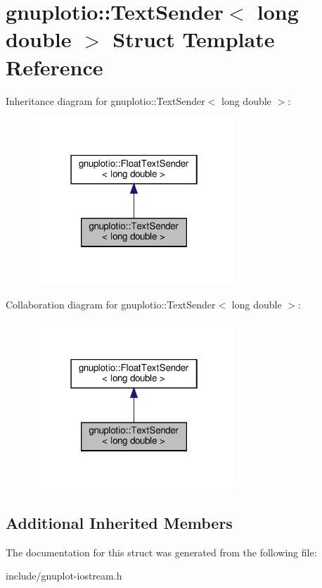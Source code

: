 \hypertarget{structgnuplotio_1_1TextSender_3_01long_01double_01_4}{}\section{gnuplotio\+:\+:Text\+Sender$<$ long double $>$ Struct Template Reference}
\label{structgnuplotio_1_1TextSender_3_01long_01double_01_4}


Inheritance diagram for gnuplotio\+:\+:Text\+Sender$<$ long double $>$\+:\nopagebreak
\begin{figure}[H]
\begin{center}
\leavevmode
\includegraphics[width=214pt]{structgnuplotio_1_1TextSender_3_01long_01double_01_4__inherit__graph}
\end{center}
\end{figure}


Collaboration diagram for gnuplotio\+:\+:Text\+Sender$<$ long double $>$\+:\nopagebreak
\begin{figure}[H]
\begin{center}
\leavevmode
\includegraphics[width=214pt]{structgnuplotio_1_1TextSender_3_01long_01double_01_4__coll__graph}
\end{center}
\end{figure}
\subsection*{Additional Inherited Members}


The documentation for this struct was generated from the following file\+:\begin{DoxyCompactItemize}
\item 
include/gnuplot-\/iostream.\+h\end{DoxyCompactItemize}
